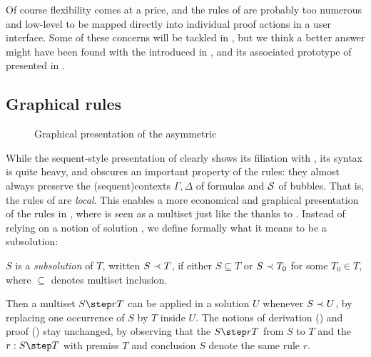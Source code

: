 \begin{scope}
Of course flexibility comes at a price, and the rules of  are probably
too numerous and low-level to be mapped directly into individual proof actions
in a user interface. Some of these concerns will be tackled in
, but we think a better answer might have been found
with the  introduced in , and its associated
prototype of  presented in .


\subsection{Graphical rules}

\begin{figure*}
  
  \caption{Graphical presentation of the asymmetric  }
\end{figure*}

While the sequent-style presentation of  clearly shows its filiation
with , its syntax is quite heavy, and obscures an important
property of the rules: they almost always preserve the \kl(sequent){contexts} $\Gamma, \Delta$
of formulas and $\mathcal{S}$ of bubbles. That is, the rules of  are
\emph{local}. This enables a more economical and graphical presentation of the
rules in , where  is seen as a multiset  just like the {\cham} thanks to . Instead of relying on
a notion of solution , we define formally what it means to be a
subsolution:

\begin{definition}[Subsolution]
  $S$ is a \emph{subsolution} of $T$, written $S \prec T$, if either $S
  \subseteq T$ or $S \prec T_0$ for some $T_0 \in T$, where $\subseteq$
  denotes multiset inclusion. 
\end{definition}

Then a multiset  $\rrule{r}{S}{T}$ can be applied in a
solution $U$ whenever $S \prec U$, by replacing one occurrence of $S$ by $T$
inside $U$. The notions of derivation () and proof
() stay unchanged, by observing that the 
$\rrule{r}{S}{T}$ from $S$ to $T$ and the 
$\irule{r}{S}{T}$ with premiss $T$ and conclusion $S$ denote the same
rule $r$.


\end{scope}
